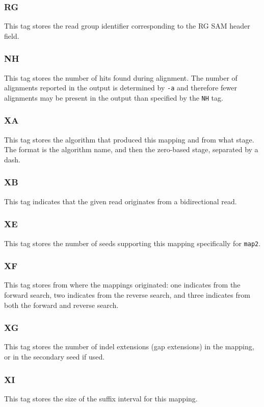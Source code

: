 \documentclass[a4paper,12pt]{book}
\newcommand{\TT}[1]{{\tt #1}} %
\begin{document}
\subsubsection{RG}
This tag stores the read group identifier corresponding to the RG SAM header field.

\subsubsection{NH}
This tag stores the number of hits found during alignment.
The number of alignments reported in the output is determined by \TT{-a} and therefore fewer alignments may be present in the output than specified by the \TT{NH} tag.

\subsubsection{XA}
This tag stores the algorithm that produced this mapping and from what stage.
The format is the algorithm name, and then the zero-based stage, separated by a dash.

\subsubsection{XB}
This tag indicates that the given read originates from a bidirectional read.

\subsubsection{XE}
This tag stores the number of seeds supporting this mapping specifically for \TT{map2}.

\subsubsection{XF}
This tag stores from where the mappings originated: one indicates from the forward search, two indicates from the reverse search, and three indicates from both the forward and reverse search.

\subsubsection{XG}
This tag stores the number of indel extensions (gap extensions) in the mapping, or in the secondary seed if used.

\subsubsection{XI}
This tag stores the size of the suffix interval for this mapping.
\end{document}
